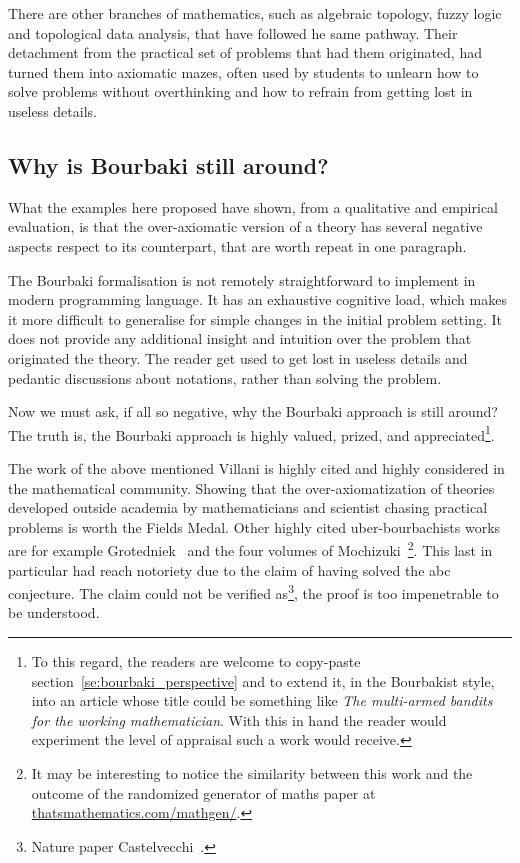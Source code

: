 \documentclass[]{scrartcl}
\theoremstyle{definition}
\begin{document}
There are other branches of mathematics, such as algebraic topology, fuzzy logic and topological data analysis, that have followed he same pathway. Their detachment from the practical set of problems that had them originated, had turned them into axiomatic mazes, often used by students to unlearn how to solve problems without overthinking and how to refrain from getting lost in useless details.

\subsection*{Why is Bourbaki still around?}

What the examples here proposed have shown, from a qualitative and empirical evaluation, is that the over-axiomatic version of a theory has several negative aspects respect to its counterpart, that are worth repeat in one paragraph.

The Bourbaki formalisation is not remotely straightforward to implement in modern programming language. It has an exhaustive cognitive load, which makes it more difficult to generalise for simple changes in the initial problem setting. It does not provide any additional insight and intuition over the problem that originated the theory. The reader get used to get lost in useless details and pedantic discussions about notations, rather than solving the problem.

Now we must ask, if all so negative, why the Bourbaki approach is still around? The truth is, the Bourbaki approach is highly valued, prized, and appreciated\footnote{
    To this regard, the readers are welcome to copy-paste section~\ref{se:bourbaki_perspective} and to extend it, in the Bourbakist style, into an article whose title could be something like \emph{The multi-armed bandits for the working mathematician}. With this in hand the reader would experiment the level of appraisal such a work would receive.
}.

The work of the above mentioned Villani is highly cited and highly considered in the mathematical community. 
Showing that the over-axiomatization of theories developed outside academia by mathematicians and scientist chasing practical problems is worth the Fields Medal.
Other highly cited uber-bourbachists works are for example Grotedniek~\cite{grothendieck2011some} and the four volumes of Mochizuki~\cite{mochizuki2012inter}\footnote{
    It may be interesting to notice the similarity between this work and the outcome of the randomized generator of maths paper at \href{https://thatsmathematics.com/mathgen/}{thatsmathematics.com/mathgen/}.
}. This last in particular had reach notoriety due to the claim of having solved the abc conjecture. The claim could not be verified as\footnote{Nature paper Castelvecchi~\cite{castelvecchi2015biggest}.}, the proof is too impenetrable to be understood.
\end{document}
